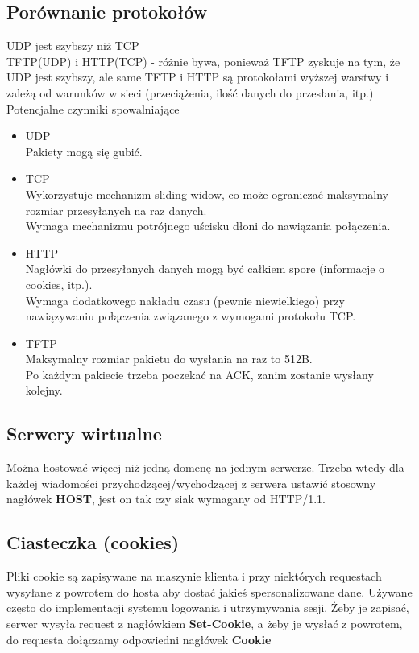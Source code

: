 \documentclass[]{article}
\begin{document}
\subsection{Porównanie protokołów}
UDP jest szybszy niż TCP \\
TFTP(UDP) i HTTP(TCP) - różnie bywa, ponieważ TFTP zyskuje na tym, że UDP jest szybszy, ale same TFTP i HTTP są protokołami wyższej warstwy i zależą od warunków w sieci (przeciążenia, ilość danych do przesłania, itp.) \\
Potencjalne czynniki spowalniające
\begin{itemize}
    \item UDP  \\
    Pakiety mogą się gubić.
    \item TCP \\
    Wykorzystuje mechanizm sliding widow, co może ograniczać maksymalny rozmiar przesyłanych na raz danych. \\
    Wymaga mechanizmu potrójnego uścisku dłoni do nawiązania połączenia. \\
    \item HTTP \\
    Nagłówki do przesyłanych danych mogą być całkiem spore (informacje o cookies, itp.). \\
    Wymaga dodatkowego nakładu czasu (pewnie niewielkiego) przy nawiązywaniu połączenia związanego z wymogami protokołu TCP.
    \item TFTP \\
    Maksymalny rozmiar pakietu do wysłania na raz to 512B. \\
    Po każdym pakiecie trzeba poczekać na ACK, zanim zostanie wysłany kolejny.
\end{itemize}

\subsection{Serwery wirtualne}
Można hostować więcej niż jedną domenę na jednym serwerze. Trzeba wtedy dla każdej wiadomości przychodzącej/wychodzącej z serwera ustawić stosowny nagłówek \textbf{HOST}, jest on tak czy siak wymagany od HTTP/1.1.
\subsection{Ciasteczka (cookies)}
Pliki cookie są zapisywane na maszynie klienta i przy niektórych requestach wysyłane z powrotem do hosta aby dostać jakieś spersonalizowane dane. Używane często do implementacji systemu logowania i utrzymywania sesji. Żeby je zapisać, serwer wysyła request z nagłówkiem \textbf{Set-Cookie}, a żeby je wysłać z powrotem, do requesta dołączamy odpowiedni nagłówek \textbf{Cookie}
\end{document}
